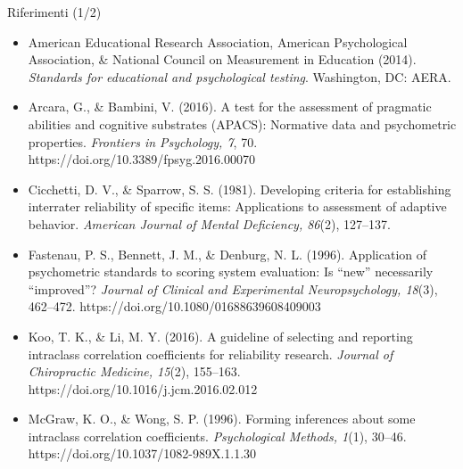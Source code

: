 \documentclass[
  ignorenonframetext,
  aspectratio=169,
]{beamer}
\providecommand{\tightlist}{%
  \setlength{\itemsep}{0pt}\setlength{\parskip}{0pt}}
\begin{document}
\begin{frame}{Riferimenti (1/2)}
\label{riferimenti-12}
\scriptsize

\begin{itemize}
\tightlist
\item
  American Educational Research Association, American Psychological
  Association, \& National Council on Measurement in Education (2014).
  \emph{Standards for educational and psychological testing}.
  Washington, DC: AERA.
\item
  Arcara, G., \& Bambini, V. (2016). A test for the assessment of
  pragmatic abilities and cognitive substrates (APACS): Normative data
  and psychometric properties. \emph{Frontiers in Psychology, 7}, 70.
  https://doi.org/10.3389/fpsyg.2016.00070
\item
  Cicchetti, D. V., \& Sparrow, S. S. (1981). Developing criteria for
  establishing interrater reliability of specific items: Applications to
  assessment of adaptive behavior. \emph{American Journal of Mental
  Deficiency, 86}(2), 127--137.
\item
  Fastenau, P. S., Bennett, J. M., \& Denburg, N. L. (1996). Application
  of psychometric standards to scoring system evaluation: Is ``new''
  necessarily ``improved''? \emph{Journal of Clinical and Experimental
  Neuropsychology, 18}(3), 462--472.
  https://doi.org/10.1080/01688639608409003
\item
  Koo, T. K., \& Li, M. Y. (2016). A guideline of selecting and
  reporting intraclass correlation coefficients for reliability
  research. \emph{Journal of Chiropractic Medicine, 15}(2), 155--163.
  https://doi.org/10.1016/j.jcm.2016.02.012
\item
  McGraw, K. O., \& Wong, S. P. (1996). Forming inferences about some
  intraclass correlation coefficients. \emph{Psychological Methods,
  1}(1), 30--46. https://doi.org/10.1037/1082-989X.1.1.30
\end{itemize}
\end{frame}
\end{document}

